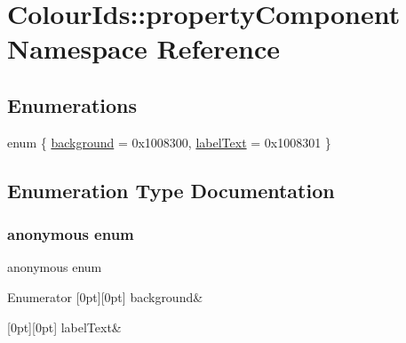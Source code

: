 \hypertarget{namespaceColourIds_1_1propertyComponent}{}\section{Colour\+Ids\+:\+:property\+Component Namespace Reference}
\label{namespaceColourIds_1_1propertyComponent}
\subsection*{Enumerations}
\begin{DoxyCompactItemize}
\item 
enum \{ \mbox{\hyperlink{namespaceColourIds_1_1propertyComponent_aa83c1c29eb61a34f26255469258e2a8eae50bb710cb18034171af1e756285bdfe}{background}} = 0x1008300, 
\mbox{\hyperlink{namespaceColourIds_1_1propertyComponent_aa83c1c29eb61a34f26255469258e2a8eaefa54db5774aee4c1875055e63709eb3}{label\+Text}} = 0x1008301
 \}
\end{DoxyCompactItemize}


\subsection{Enumeration Type Documentation}
\mbox{\label{namespaceColourIds_1_1propertyComponent_aa83c1c29eb61a34f26255469258e2a8e}} 
\subsubsection{\texorpdfstring{anonymous enum}{anonymous enum}}
{\footnotesize\ttfamily anonymous enum}

\begin{DoxyEnumFields}{Enumerator}
[0pt][0pt]{}\mbox{\label{namespaceColourIds_1_1propertyComponent_aa83c1c29eb61a34f26255469258e2a8eae50bb710cb18034171af1e756285bdfe}} 
background&\\
\hline

[0pt][0pt]{}\mbox{\label{namespaceColourIds_1_1propertyComponent_aa83c1c29eb61a34f26255469258e2a8eaefa54db5774aee4c1875055e63709eb3}} 
label\+Text&\\
\hline

\end{DoxyEnumFields}
